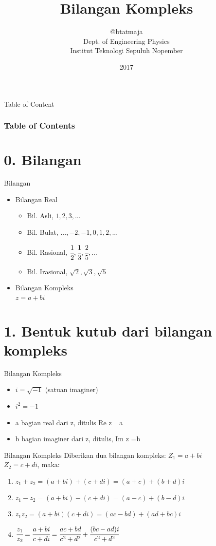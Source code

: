 \documentclass{beamer}
\title{Bilangan Kompleks}
\author{@btatmaja\\Dept. of Engineering Physics \\ Institut Teknologi Sepuluh Nopember}
\date{2017}
\begin{document}
	\frame{\titlepage}

\begin{frame}[t,fragile]{Table of Content}
\frametitle{Table of Contents}
\tableofcontents
\end{frame}

\section{0. Bilangan}
\begin{frame}[t,fragile]{Bilangan}
\begin{itemize}
\item Bilangan Real
\begin{itemize}
\item Bil. Asli, $1, 2, 3, ...$ \vskip10pt
\item Bil. Bulat, $...,-2,-1,0,1,2,...$ \vskip5pt
\item Bil. Rasional, $\cfrac{1}{2}, \cfrac{1}{3},\cfrac{2}{5}, ...$ \vskip10pt
\item Bil. Irasional, $\sqrt{2}, \sqrt{3}, \sqrt{5}$ \vskip10pt
\end{itemize}
\item Bilangan Kompleks \\
\hskip10pt $z=a+bi$
\end{itemize}
\end{frame}

\section{1. Bentuk kutub dari bilangan kompleks}
\begin{frame}[t, fragile]{Bilangan Kompleks}
\begin{center}
\end{center}
\vskip10pt
\begin{itemize}
\item $i=\sqrt{-1}$ (satuan imaginer)
\item $i^2 = -1$
\item a bagian real dari z, ditulis  Re z =a
\item b bagian imaginer dari z, ditulis, Im z =b
\end{itemize}
\end{frame}

\begin{frame}[t, fragile]{Bilangan Kompleks}
Diberikan dua bilangan kompleks: $Z_1=a+bi$\\
                     \hskip160pt $Z_2=c+di$, maka:
\vskip10pt
\begin{enumerate}
\item $z_1+z_2 = (a+bi) + (c+di) = (a+c) + (b+d)i$
\item $z_1-z_2 = (a+bi) - (c+di) = (a-c) + (b-d)i$
\item $z_1 z_2 = (a+bi) (c+di) = (ac-bd) + (ad + bc)i$
\item $\cfrac{z_1}{z_2}= \cfrac{a+bi}{c+di}=\cfrac{ac+bd}{c^2+d^2} + \cfrac{(bc - ad)i}{c^2+d^2}$
\end{enumerate}
\end{frame}
\end{document}
